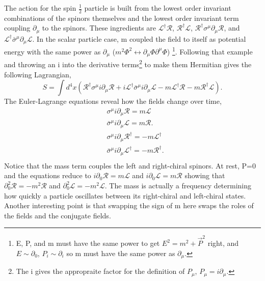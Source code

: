 The action for the spin $\frac{1}{2}$ particle is built from the lowest order invariant combinations of the spinors themselves and the lowest order invariant term coupling $\partial_\mu$ to the spinors. These ingredients are $\mathcal{L}^\dagger\mathcal{R}$, $\mathcal{R}^\dagger\mathcal{L}$, $\mathcal{R}^\dagger\sigma^\mu\partial_\mu\mathcal{R}$, and $\mathcal{L}^\dagger\bar{\sigma}^\mu\partial_\mu\mathcal{L}$. In the scalar particle case, m coupled the field to itself as potential energy with the same power as $\partial_\mu$ ($m^2\Phi^2\leftrightarrow\partial_\mu\Phi\partial^\mu\Phi$) \footnote{E, P, and m must have the same power to get $E^2 = m^2 + \vec{P}^2$ right, and $E \sim \partial_0$, $P_i \sim \partial_i$ so m must have the same power as $\partial_\mu$.}. Following that example and throwing an i into the derivative terms\footnote{The i gives the appropraite factor for the definition of $P_\mu$, $P_\mu = i\partial_\mu$.} to make them Hermitian gives the following Lagrangian,  
\begin{equation}
S = \int d^4x \left( \mathcal{R}^\dagger\sigma^\mu i\partial_\mu\mathcal{R} + i\mathcal{L}^\dagger\bar{\sigma}^\mu i\partial_\mu\mathcal{L} 
- m\mathcal{L}^\dagger\mathcal{R} - m\mathcal{R}^\dagger\mathcal{L} \right).
\end{equation} 
The Euler-Lagrange equations reveal how the fields change over time,
\begin{equation}
\begin{split}
& \sigma^\mu i\partial_\mu\mathcal{R} = m\mathcal{L} \\
& \bar{\sigma}^\mu i\partial_\mu\mathcal{L} = m\mathcal{R}. \\
& \sigma^\mu i\partial_\mu\mathcal{R}^\dagger = -m\mathcal{L}^\dagger \\
& \bar{\sigma}^\mu i\partial_\mu\mathcal{L}^\dagger = -m\mathcal{R}^\dagger. \\
\end{split}
\end{equation}
Notice that the mass term couples the left and right-chiral spinors. At rest, P=0 and the equations reduce to $i\partial_0\mathcal{R} = m\mathcal{L}$ and $i\partial_0\mathcal{L} = m\mathcal{R}$ showing that $\partial^2_0 \mathcal{R} = -m^2\mathcal{R}$ and $\partial^2_0 \mathcal{L} = -m^2\mathcal{L}$. The mass is actually a frequency determining how quickly a particle oscillates between its right-chiral and left-chiral states. Another interesting point is that swapping the sign of m here swaps the roles of the fields and the conjugate fields. 

